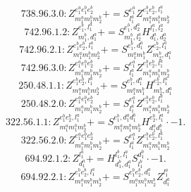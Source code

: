 \documentclass[letterpaper,10pt,fleqn,leqno,onecolumn]{article}
\begin{document}
\begin{equation} \;\;\;\;\;\;  738.96.3.0: Z^{e_{1}^{a}e_{1}^{b}e_{2}^{b}}_{m_{1}^{a}m_{1}^{b}m_{2}^{b}}+=S^{e_{1}^{a}}_{l_{1}^{a}}Z^{e_{1}^{b}e_{2}^{b},l_{1}^{a}}_{m_{1}^{a}m_{1}^{b}m_{2}^{b}} \end{equation}
\begin{equation} \;\;\;\;\;\;  742.96.1.2: Z^{e_{1}^{b},l_{1}^{a}}_{m_{1}^{b},d_{1}^{a}}+=S^{e_{1}^{b},d_{2}^{a}}_{m_{1}^{b},l_{2}^{a}}H^{l_{1}^{a},l_{2}^{a}}_{d_{1}^{a},d_{2}^{a}} \end{equation}
\begin{equation} \;\;\;\;\;\;  742.96.2.1: Z^{e_{1}^{b}e_{2}^{b},l_{1}^{a}}_{m_{1}^{a}m_{1}^{b}m_{2}^{b}}+=S^{e_{1}^{b},d_{1}^{a}}_{m_{1}^{a}m_{1}^{b}}Z^{e_{2}^{b},l_{1}^{a}}_{m_{2}^{b},d_{1}^{a}} \end{equation}
\begin{equation} \;\;\;\;\;\;  742.96.3.0: Z^{e_{1}^{a}e_{1}^{b}e_{2}^{b}}_{m_{1}^{a}m_{1}^{b}m_{2}^{b}}+=S^{e_{1}^{a}}_{l_{1}^{a}}Z^{e_{1}^{b}e_{2}^{b},l_{1}^{a}}_{m_{1}^{a}m_{1}^{b}m_{2}^{b}} \end{equation}
\begin{equation} \;\;\;\;\;\;  250.48.1.1: Z^{e_{1}^{b}e_{2}^{b},l_{1}^{a}}_{m_{1}^{a}m_{1}^{b}m_{2}^{b}}+=S^{e_{1}^{b},d_{1}^{a}}_{m_{1}^{a}m_{1}^{b}}H^{e_{2}^{b},l_{1}^{a}}_{m_{2}^{b},d_{1}^{a}} \end{equation}
\begin{equation} \;\;\;\;\;\;  250.48.2.0: Z^{e_{1}^{a}e_{1}^{b}e_{2}^{b}}_{m_{1}^{a}m_{1}^{b}m_{2}^{b}}+=S^{e_{1}^{a}}_{l_{1}^{a}}Z^{e_{1}^{b}e_{2}^{b},l_{1}^{a}}_{m_{1}^{a}m_{1}^{b}m_{2}^{b}} \end{equation}
\begin{equation} \;\;\;\;\;\;  322.56.1.1: Z^{e_{1}^{b}e_{2}^{b},l_{1}^{a}}_{m_{1}^{a}m_{1}^{b}m_{2}^{b}}+=S^{e_{1}^{b},d_{1}^{a}d_{1}^{b}}_{m_{1}^{a}m_{1}^{b}m_{2}^{b}}H^{e_{2}^{b},l_{1}^{a}}_{d_{1}^{a}d_{1}^{b}}\cdot -1. \end{equation}
\begin{equation} \;\;\;\;\;\;  322.56.2.0: Z^{e_{1}^{a}e_{1}^{b}e_{2}^{b}}_{m_{1}^{a}m_{1}^{b}m_{2}^{b}}+=S^{e_{1}^{a}}_{l_{1}^{a}}Z^{e_{1}^{b}e_{2}^{b},l_{1}^{a}}_{m_{1}^{a}m_{1}^{b}m_{2}^{b}} \end{equation}
\begin{equation} \;\;\;\;\;\;  694.92.1.2: Z^{l_{1}^{a}}_{d_{1}^{a}}+=H^{l_{1}^{b},l_{1}^{a}}_{d_{1}^{b},d_{1}^{a}}S^{d_{1}^{b}}_{l_{1}^{b}}\cdot -1. \end{equation}
\begin{equation} \;\;\;\;\;\;  694.92.2.1: Z^{e_{1}^{b}e_{2}^{b},l_{1}^{a}}_{m_{1}^{a}m_{1}^{b}m_{2}^{b}}+=S^{e_{1}^{b}e_{2}^{b},d_{1}^{a}}_{m_{1}^{a}m_{1}^{b}m_{2}^{b}}Z^{l_{1}^{a}}_{d_{1}^{a}} \end{equation}
\end{document}
